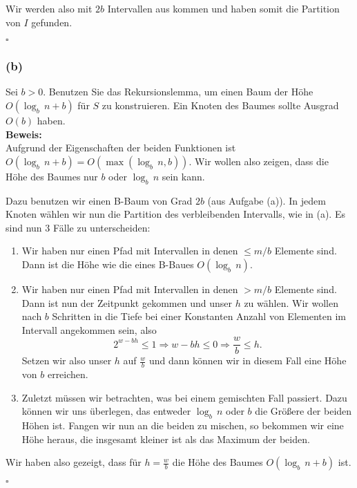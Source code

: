 \documentclass[11pt,a4paper,ngerman]{article}
\begin{document}
Wir werden also mit $2b$ Intervallen aus kommen und haben somit die Partition von $I$ gefunden.

\mbox{}\hfill$\square$

\subsubsection*{(b)}

Sei $b > 0$. Benutzen Sie das Rekursionslemma, um einen Baum der Höhe $O(\log_b \, n + b)$ für $S$ zu konstruieren. Ein Knoten des Baumes sollte Ausgrad $O(b)$ haben.\\

\noindent\textbf{Beweis:}\\

Aufgrund der Eigenschaften der beiden Funktionen ist $O(\log_b \, n + b) = O(\max(\log_b \, n, b))$. Wir wollen also zeigen, dass die Höhe des Baumes nur $b$ oder $\log_b \, n$ sein kann.

Dazu benutzen wir einen B-Baum von Grad $2b$ (aus Aufgabe (a)). In jedem Knoten wählen
wir nun die Partition des verbleibenden Intervalls, wie in (a). 
Es sind nun 3 Fälle zu unterscheiden:
\begin{enumerate}
   \item Wir haben nur einen Pfad mit Intervallen in denen $\leq m/b$ Elemente sind. 
      Dann ist
      die Höhe wie die eines B-Baues $O(\log_b \, n)$.
   \item Wir haben nur einen Pfad mit Intervallen in denen $>m/b$ Elemente sind.
      Dann ist nun der Zeitpunkt gekommen und unser $h$ zu wählen. Wir wollen 
      nach $b$ Schritten in die Tiefe bei einer Konstanten Anzahl von Elementen im
      Intervall angekommen sein, also
      $$
         2^{w-bh} \leq 1 \Rightarrow w-bh \leq 0 \Rightarrow \frac{w}{b} \leq h.
      $$
      Setzen wir also unser $h$ auf $\frac{w}{b}$ und dann können wir in diesem
      Fall eine Höhe von $b$ erreichen.
   \item Zuletzt müssen wir betrachten, was bei einem gemischten Fall passiert.
      Dazu können wir uns überlegen, das entweder $\log_b \, n$ oder $b$ die Größere
      der beiden Höhen ist. Fangen wir nun an die beiden zu mischen, so bekommen
      wir eine Höhe heraus, die insgesamt kleiner ist als das Maximum der beiden.
\end{enumerate}

Wir haben also gezeigt, dass für $h = \frac{w}{b}$ die Höhe des Baumes $O(\log_b \, n + b)$ ist.

\mbox{}\hfill$\square$
\end{document}
